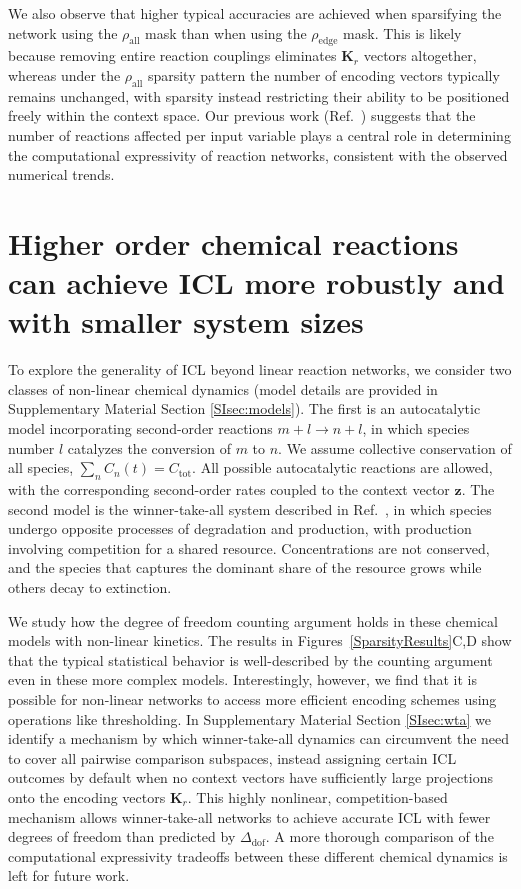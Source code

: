 \documentclass[%
reprint,
superscriptaddress,
amsmath,amssymb,
aps,
]{revtex4-2}
\begin{document}
	We also observe that higher typical accuracies are achieved when sparsifying the network using the $\rho_\text{all}$ mask than when using the $\rho_\text{edge}$ mask. This is likely because removing entire reaction couplings eliminates $\mathbf{K}_r$ vectors altogether, whereas under the $\rho_\text{all}$ sparsity pattern the number of encoding vectors typically remains unchanged, with sparsity instead restricting their ability to be positioned freely within the context space. Our previous work (Ref.~) suggests that the number of reactions affected per input variable plays a central role in determining the computational expressivity of reaction networks, consistent with the observed numerical trends.
	
	\section{Higher order chemical reactions can achieve ICL more robustly and with smaller system sizes} \label{sec:nonlinmodels}
	To explore the generality of ICL beyond linear reaction networks, we consider two classes of non-linear chemical dynamics (model details are provided in Supplementary Material Section \ref{SIsec:models}). The first is an autocatalytic model incorporating second-order reactions $m + l \rightarrow n + l$, in which species number $l$ catalyzes the conversion of $m$ to $n$. We assume collective conservation of all species, $\sum_n C_n(t) = C_{\text{tot}}$. All possible autocatalytic reactions are allowed, with the corresponding second-order rates coupled to the context vector $\mathbf{z}$. The second model is the winner-take-all system described in Ref.~, in which species undergo opposite processes of degradation and production, with production involving competition for a shared resource. Concentrations are not conserved, and the species that captures the dominant share of the resource grows while others decay to extinction.   
	
	We study how the degree of freedom counting argument holds in these  chemical models with non-linear kinetics.  The results in Figures~\ref{SparsityResults}C,D show that the typical statistical behavior is well-described by the counting argument even in these more complex models.  Interestingly, however, we find that it is possible for non-linear networks to access more efficient encoding schemes using operations like thresholding. In Supplementary Material Section \ref{SIsec:wta} we identify a mechanism by which winner-take-all dynamics can circumvent the need to cover all pairwise comparison subspaces, instead assigning certain ICL outcomes by default when no context vectors have sufficiently large projections onto the encoding vectors $\mathbf{K}_r$. This highly nonlinear, competition-based mechanism allows winner-take-all networks to achieve accurate ICL with fewer degrees of freedom than predicted by $\Delta_\text{dof}$. A more thorough comparison of the computational expressivity tradeoffs between these different chemical dynamics is left for future work. 
	
\end{document}
